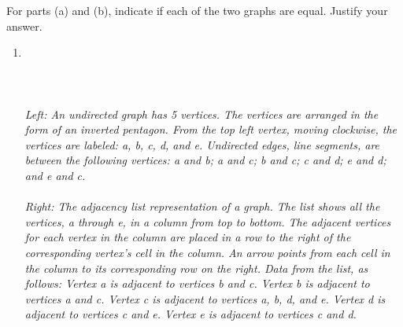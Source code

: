 \documentclass{amsart}
\theoremstyle{definition}
\theoremstyle{Exercise}
\theoremstyle{remark}
\theoremstyle{rule}
\numberwithin{equation}{section}
\begin{document}
For parts (a) and (b), indicate if each of the two graphs are equal. Justify your answer.\\
 \begin{enumerate}[label=(\alph*)]
 

  \item
\hfil
\\\\
\\\\
 {\color{blue}{\bf Figure 1:} \emph{Left: An undirected graph has 5 vertices. The vertices are arranged in the form of an inverted pentagon. From the top left vertex, moving clockwise, the vertices are labeled: a, b, c, d, and e. Undirected edges, line segments, are between the following vertices: a and b; a and c; b and c; c and d; e and d; and e and c. \\
 }
 }\\
{\color{blue}{\bf Figure 2:} \emph{
  Right: The adjacency list representation of a graph. The list shows all the vertices, a through e, in a column from top to bottom. The adjacent vertices for each vertex in the column are placed in a row to the right of the corresponding vertex’s cell in the column. An arrow points from each cell in the column to its corresponding row on the right. Data from the list, as follows: Vertex a is adjacent to vertices b and c. Vertex b is adjacent to vertices a and c. Vertex c is adjacent to vertices a, b, d, and e. Vertex d is adjacent to vertices c and e. Vertex e is adjacent to vertices c and d.
}
}
\\\\


\end{enumerate}
\end{document}
